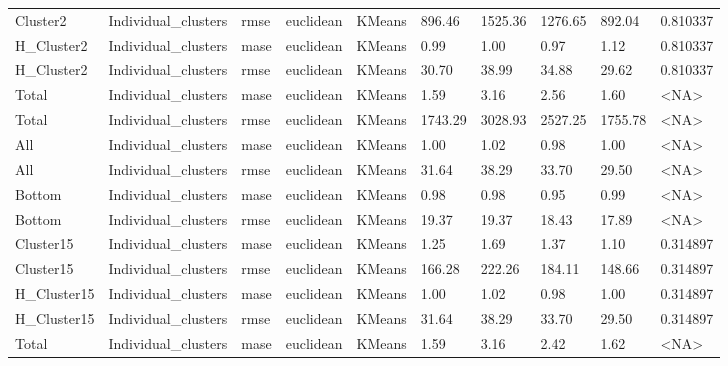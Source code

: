 \begin{tabular}{llllllllll}
   Cluster2 & Individual\_clusters &   rmse &  euclidean &        KMeans &  896.46 &  1525.36 &               1276.65 &        892.04 &  0.810337 \\
 H\_Cluster2 & Individual\_clusters &   mase &  euclidean &        KMeans &    0.99 &     1.00 &                  0.97 &          1.12 &  0.810337 \\
 H\_Cluster2 & Individual\_clusters &   rmse &  euclidean &        KMeans &   30.70 &    38.99 &                 34.88 &         29.62 &  0.810337 \\
      Total & Individual\_clusters &   mase &  euclidean &        KMeans &    1.59 &     3.16 &                  2.56 &          1.60 &      <NA> \\
      Total & Individual\_clusters &   rmse &  euclidean &        KMeans & 1743.29 &  3028.93 &               2527.25 &       1755.78 &      <NA> \\
        All & Individual\_clusters &   mase &  euclidean &        KMeans &    1.00 &     1.02 &                  0.98 &          1.00 &      <NA> \\
        All & Individual\_clusters &   rmse &  euclidean &        KMeans &   31.64 &    38.29 &                 33.70 &         29.50 &      <NA> \\
     Bottom & Individual\_clusters &   mase &  euclidean &        KMeans &    0.98 &     0.98 &                  0.95 &          0.99 &      <NA> \\
     Bottom & Individual\_clusters &   rmse &  euclidean &        KMeans &   19.37 &    19.37 &                 18.43 &         17.89 &      <NA> \\
  Cluster15 & Individual\_clusters &   mase &  euclidean &        KMeans &    1.25 &     1.69 &                  1.37 &          1.10 &  0.314897 \\
  Cluster15 & Individual\_clusters &   rmse &  euclidean &        KMeans &  166.28 &   222.26 &                184.11 &        148.66 &  0.314897 \\
H\_Cluster15 & Individual\_clusters &   mase &  euclidean &        KMeans &    1.00 &     1.02 &                  0.98 &          1.00 &  0.314897 \\
H\_Cluster15 & Individual\_clusters &   rmse &  euclidean &        KMeans &   31.64 &    38.29 &                 33.70 &         29.50 &  0.314897 \\
      Total & Individual\_clusters &   mase &  euclidean &        KMeans &    1.59 &     3.16 &                  2.42 &          1.62 &      <NA> \\

\end{tabular}
